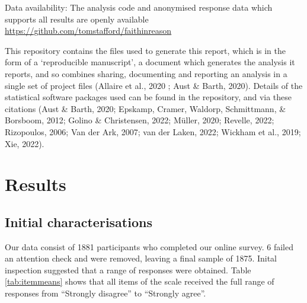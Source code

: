 \documentclass[
  ,jou,floatsintext]{apa6}
\begin{document}
Data availability: The analysis code and anonymised response data which supports all results are openly available \url{https://github.com/tomstafford/faithinreason}

This repository contains the files used to generate this report, which is in the form of a `reproducible manuscript', a document which generates the analysis it reports, and so combines sharing, documenting and reporting an analysis in a single set of project files (Allaire et al., 2020 ; Aust \& Barth, 2020). Details of the statistical software packages used can be found in the repository, and via these citations (Aust \& Barth, 2020; Epskamp, Cramer, Waldorp, Schmittmann, \& Borsboom, 2012; Golino \& Christensen, 2022; Müller, 2020; Revelle, 2022; Rizopoulos, 2006; Van der Ark, 2007; van der Laken, 2022; Wickham et al., 2019; Xie, 2022).

\hypertarget{results}{%
\section{Results}\label{results}}

\hypertarget{initial-characterisations}{%
\subsection{Initial characterisations}\label{initial-characterisations}}

Our data consist of 1881 participants who completed our online survey. 6 failed an attention check and were removed, leaving a final sample of 1875. Inital inspection suggested that a range of responses were obtained. Table \ref{tab:itemmeans} shows that all items of the scale received the full range of responses from ``Strongly disagree'' to ``Strongly agree''.
\end{document}
